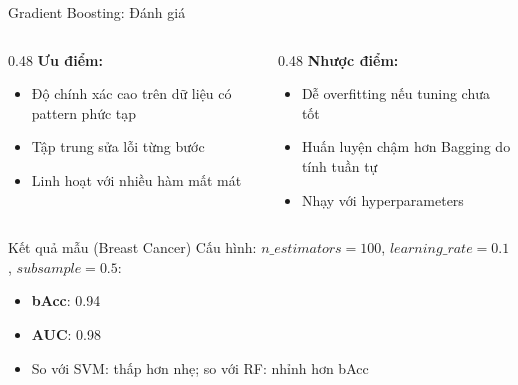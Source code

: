 \begin{frame}[shrink=10]{Gradient Boosting: Đánh giá}
    \begin{columns}[T]
        \begin{column}{0.48\textwidth}
            \textbf{Ưu điểm:}
            \begin{itemize}
                \item Độ chính xác cao trên dữ liệu có pattern phức tạp
                \item Tập trung sửa lỗi từng bước
                \item Linh hoạt với nhiều hàm mất mát
            \end{itemize}
        \end{column}
        \begin{column}{0.48\textwidth}
            \textbf{Nhược điểm:}
            \begin{itemize}
                \item Dễ overfitting nếu tuning chưa tốt
                \item Huấn luyện chậm hơn Bagging do tính tuần tự
                \item Nhạy với hyperparameters
            \end{itemize}
        \end{column}
    \end{columns}

    \begin{alertblock}{Kết quả mẫu (Breast Cancer)}
        Cấu hình: $n\_estimators=100$, $learning\_rate=0.1$, $subsample=0.5$:
        \begin{itemize}
            \item \textbf{bAcc}: 0.94
            \item \textbf{AUC}: 0.98
            \item So với SVM: thấp hơn nhẹ; so với RF: nhỉnh hơn bAcc
        \end{itemize}
    \end{alertblock}

    \hfill{\scriptsize \cite{duchesnay2021statsml}}
\end{frame}
